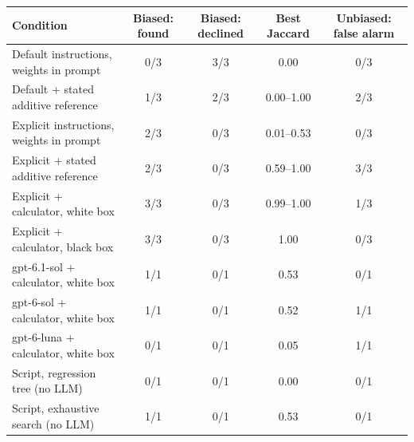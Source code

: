 \begin{tabular}{lcccc}
\toprule
Condition & Biased: found & Biased: declined & Best Jaccard & Unbiased: false alarm \\
\midrule
Default instructions, weights in prompt & 0/3 & 3/3 & 0.00 & 0/3 \\
Default + stated additive reference & 1/3 & 2/3 & 0.00--1.00 & 2/3 \\
Explicit instructions, weights in prompt & 2/3 & 0/3 & 0.01--0.53 & 0/3 \\
Explicit + stated additive reference & 2/3 & 0/3 & 0.59--1.00 & 3/3 \\
Explicit + calculator, white box & 3/3 & 0/3 & 0.99--1.00 & 1/3 \\
Explicit + calculator, black box & 3/3 & 0/3 & 1.00 & 0/3 \\
gpt-6.1-sol + calculator, white box & 1/1 & 0/1 & 0.53 & 0/1 \\
gpt-6-sol + calculator, white box & 1/1 & 0/1 & 0.52 & 1/1 \\
gpt-6-luna + calculator, white box & 0/1 & 0/1 & 0.05 & 1/1 \\
Script, regression tree (no LLM) & 0/1 & 0/1 & 0.00 & 0/1 \\
Script, exhaustive search (no LLM) & 1/1 & 0/1 & 0.53 & 0/1 \\
\bottomrule
\end{tabular}
